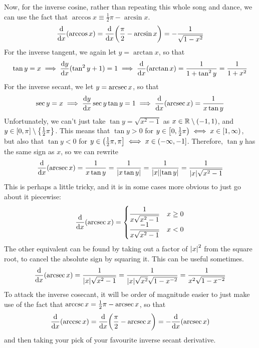 \documentclass[fleqn,a4paper,11pt]{article}
\newcommand{\setstyle}{\mathbb}
\newcommand{\Reals}{\setstyle R}
\begin{document}
    Now, for the inverse cosine, rather than repeating this whole song and
    dance, we can use the fact that
    \(\arccos x \equiv \frac 12 \pi - \arcsin x\).
    \begin{equation*}
    \dv{x}(\arccos x) = \dv{x}(\frac \pi 2 - \arcsin x)
        = -\frac 1{\sqrt{1 - x^2}}
    \end{equation*}
    For the inverse tangent, we again let \(y = \arctan x\), so that
    \begin{equation*}
    \tan y = x \implies \dv{y}{x} {(\tan^2 y + 1)} = 1
        \implies \dv{x}(\arctan x) = \frac 1{1 + \tan^2 y}
            = \frac 1{1 + x^2}
    \end{equation*}
    For the inverse secant, we let \(y = \arcsec x\), so that
    \begin{equation*}
    \sec y = x \implies \dv{y}{x} \sec y \tan y = 1
        \implies \dv{x}(\arcsec x) = \frac 1{x \tan y}
    \end{equation*}
    Unfortunately, we can't just take \(\tan y = \sqrt{x^2 - 1}\) as
    \(x \in \Reals \setminus \intoo{-1, 1}\), and
    \(y \in \intcc{0, \pi} \setminus \set{\frac 12 \pi}\). This means that
    \(\tan y > 0\) for
    \(y \in \intco{0, \frac 12 \pi} \iff x \in \intco{1, \infty}\), but also
    that \(\tan y < 0\) for
    \(y \in \intoc{\frac 12 \pi, \pi} \iff x \in \intoc{-\infty, -1}\).
    Therefore, \(\tan y\) has the same sign as \(x\), so we can rewrite
    \begin{equation*}
    \dv{x}(\arcsec x) = \frac 1{x \tan y} = \frac 1{\abs{x \tan y}}
        = \frac 1{\abs{x}\abs{\tan y}} = \frac 1{\abs{x}\sqrt{x^2 - 1}}
    \end{equation*}
    This is perhaps a little tricky, and it is in some cases more obvious to
    just go about it piecewise:
    \begin{equation*}
    \dv{x}(\arcsec x) = \begin{cases}
        \dfrac 1{x\sqrt{x^2 - 1}} & x \ge 0 \\
        \dfrac {-1}{x\sqrt{x^2 - 1}} & x < 0
    \end{cases}
    \end{equation*}
    The other equivalent can be found by taking out a factor of \(\abs{x}^2\)
    from the square root, to cancel the absolute sign by squaring it. This can
    be useful sometimes.
    \begin{equation*}
    \dv{x}(\arcsec x) = \frac 1{\abs{x}\sqrt{x^2 - 1}}
        = \frac 1{\abs{x}\sqrt{x^2}\sqrt{1 - x^{-2}}}
        = \frac 1{x^2\sqrt{1 - x^{-2}}}
    \end{equation*}
    To attack the inverse cosecant, it will be order of magnitude easier to just
    make use of the fact that \(\arccsc x = \frac 12 \pi - \arcsec x\),
    so that
    \begin{equation*}
    \dv{x}(\arccsc x) = \dv{x}(\frac \pi 2 - \arcsec x) = -\dv{x}(\arcsec x)
    \end{equation*}
    and then taking your pick of your favourite inverse secant derivative.
\end{document}
